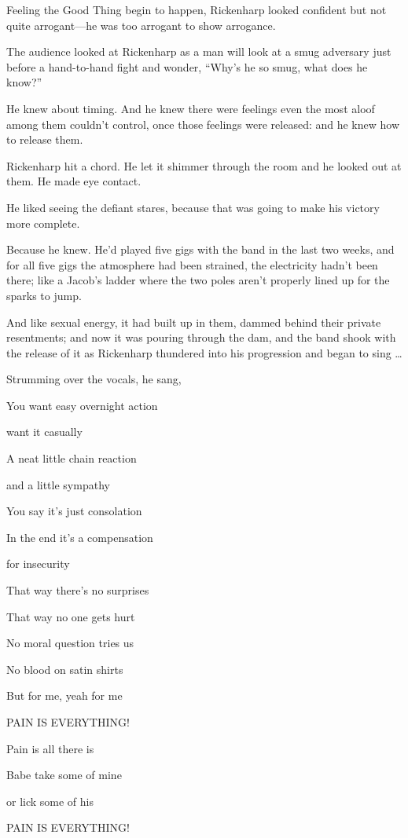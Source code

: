 Feeling the Good Thing begin to happen, Rickenharp looked confident but not quite arrogant—he was too arrogant to show arrogance.

The audience looked at Rickenharp as a man will look at a smug adversary just before a hand-to-hand fight and wonder, “Why’s he so smug, what does he know?”

He knew about timing. And he knew there were feelings even the most aloof among them couldn’t control, once those feelings were released: and he knew how to release them.

Rickenharp hit a chord. He let it shimmer through the room and he looked out at them. He made eye contact.

He liked seeing the defiant stares, because that was going to make his victory more complete.

Because he knew. He’d played five gigs with the band in the last two weeks, and for all five gigs the atmosphere had been strained, the electricity hadn’t been there; like a Jacob’s ladder where the two poles aren’t properly lined up for the sparks to jump.

And like sexual energy, it had built up in them, dammed behind their private resentments; and now it was pouring through the dam, and the band shook with the release of it as Rickenharp thundered into his progression and began to sing …

Strumming over the vocals, he sang,

You want easy overnight action

want it casually

A neat little chain reaction

and a little sympathy

You say it’s just consolation

In the end it’s a compensation

for insecurity

That way there’s no surprises

That way no one gets hurt

No moral question tries us

No blood on satin shirts

But for me, yeah for me

PAIN IS EVERYTHING!

Pain is all there is

Babe take some of mine

or lick some of his

PAIN IS EVERYTHING!

